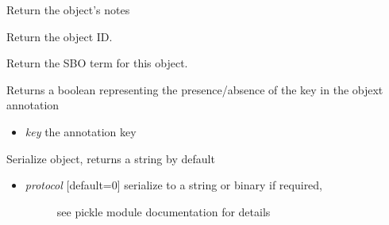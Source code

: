 \documentclass[a4paper,11pt,english]{sphinxmanual}
\begin{document}
\begin{fulllineitems}

\begin{fulllineitems}
\label{modules_doc:cbmpy.CBModel.Fbase.getNotes}
Return the object's notes

\end{fulllineitems}


\begin{fulllineitems}
\label{modules_doc:cbmpy.CBModel.Fbase.getPid}
Return the object ID.

\end{fulllineitems}


\begin{fulllineitems}
\label{modules_doc:cbmpy.CBModel.Fbase.getSBOterm}
Return the SBO term for this object.

\end{fulllineitems}


\begin{fulllineitems}
\label{modules_doc:cbmpy.CBModel.Fbase.hasAnnotation}
Returns a boolean representing the presence/absence of the key in the objext annotation
\begin{itemize}
\item {} 
\emph{key} the annotation key

\end{itemize}

\end{fulllineitems}


\begin{fulllineitems}
\label{modules_doc:cbmpy.CBModel.Fbase.serialize}
Serialize object, returns a string by default
\begin{itemize}
\item {} \begin{description}
\item[{\emph{protocol} {[}default=0{]} serialize to a string or binary if required,}] \leavevmode
see pickle module documentation for details


\end{description}
\end{itemize}
\end{fulllineitems}
\end{fulllineitems}
\end{document}
